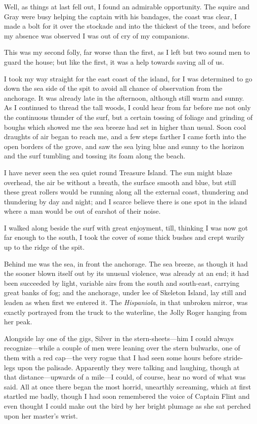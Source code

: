 Well, as things at last fell out, I found an admirable opportunity. The squire and Gray were busy helping the captain with his bandages, the coast was clear, I made a bolt for it over the stockade and into the thickest of the trees, and before my absence was observed I was out of cry of my companions.

This was my second folly, far worse than the first, as I left but two sound men to guard the house; but like the first, it was a help towards saving all of us.

I took my way straight for the east coast of the island, for I was determined to go down the sea side of the spit to avoid all chance of observation from the anchorage. It was already late in the afternoon, although still warm and sunny. As I continued to thread the tall woods, I could hear from far before me not only the continuous thunder of the surf, but a certain tossing of foliage and grinding of boughs which showed me the sea breeze had set in higher than usual. Soon cool draughts of air began to reach me, and a few steps farther I came forth into the open borders of the grove, and saw the sea lying blue and sunny to the horizon and the surf tumbling and tossing its foam along the beach.

I have never seen the sea quiet round Treasure Island. The sun might blaze overhead, the air be without a breath, the surface smooth and blue, but still these great rollers would be running along all the external coast, thundering and thundering by day and night; and I scarce believe there is one spot in the island where a man would be out of earshot of their noise.

I walked along beside the surf with great enjoyment, till, thinking I was now got far enough to the south, I took the cover of some thick bushes and crept warily up to the ridge of the spit.

Behind me was the sea, in front the anchorage. The sea breeze, as though it had the sooner blown itself out by its unusual violence, was already at an end; it had been succeeded by light, variable airs from the south and south-east, carrying great banks of fog; and the anchorage, under lee of Skeleton Island, lay still and leaden as when first we entered it. The \textit{Hispaniola}, in that unbroken mirror, was exactly portrayed from the truck to the waterline, the Jolly Roger hanging from her peak.

Alongside lay one of the gigs, Silver in the stern-sheets---him I could always recognize---while a couple of men were leaning over the stern bulwarks, one of them with a red cap---the very rogue that I had seen some hours before stride-legs upon the palisade. Apparently they were talking and laughing, though at that distance---upwards of a mile---I could, of course, hear no word of what was said. All at once there began the most horrid, unearthly screaming, which at first startled me badly, though I had soon remembered the voice of Captain Flint and even thought I could make out the bird by her bright plumage as she sat perched upon her master’s wrist.

